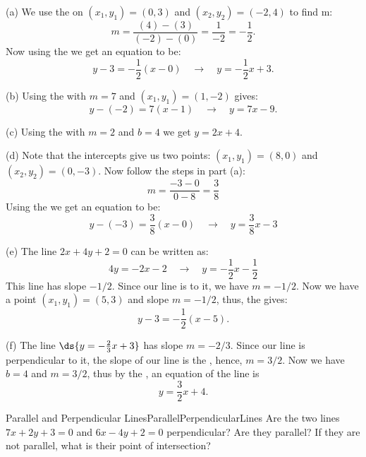\begin{solution} 
\noindent(a) We use the  on $(x_1,y_1)=(0,3)$ and $(x_2,y_2)=(-2,4)$ to find m:
$$m=\frac{(4)-(3)}{(-2)-(0)}=\frac{1}{-2}=-\frac{1}{2}.$$
Now using the  we get an equation to be:
$$y-3=-\frac{1}{2}\left(x-0\right)\quad\to\quad y=-\frac{1}{2}x+3.$$

\noindent(b) Using the  with $m=7$ and $(x_1,y_1)=(1,-2)$ gives:
$$y-(-2)=7(x-1)\quad\to\quad y = 7x-9.$$

\noindent(c) Using the  with $m=2$ and $b=4$ we get $y=2x+4$.

\noindent(d) Note that the intercepts give us two points: $(x_1,y_1)=(8,0)$ and $(x_2,y_2)=(0,-3)$.
Now follow the steps in part (a):
$$m=\frac{-3-0}{0-8}=\frac{3}{8}$$
Using the  we get an equation to be:
$$y-(-3)=\frac{3}{8}\left(x-0\right)\quad\to\quad y=\frac{3}{8}x-3$$

\noindent(e)  The line $2x+4y+2=0$ can be written as:
$$4y = -2x - 2 \quad\to\quad y=-\frac{1}{2}x-\frac{1}{2}$$
This line has slope $-1/2$.
Since our line is  to it, we have $m=-1/2$.
Now we have a point $(x_1,y_1)=(5,3)$ and slope $m=-1/2$, thus, the  gives:
$$y-3=-\frac{1}{2}\left(x-5\right).$$

\noindent(f) The line $\ds{y=-\frac{2}{3}x+3}$ has slope $m=-2/3$.
Since our line is perpendicular to it, the slope of our line is the , hence, $m=3/2$.
Now we have $b=4$ and $m=3/2$, thus by the , an equation of the line is
$$y=\frac{3}{2}x+4.$$
\vspace{-0.5cm}
\end{solution}


\begin{example}{Parallel and Perpendicular Lines}{ParallelPerpendicularLines}
Are the two lines $7x+2y+3=0$ and $6x-4y+2=0$ perpendicular? Are they parallel? If they are not parallel, what is their point of intersection?
\end{example}

